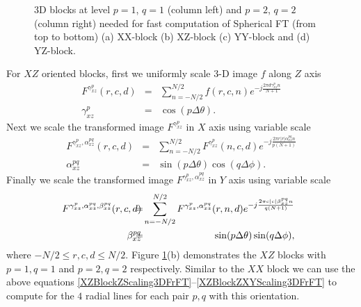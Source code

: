 \documentclass{UCF_ETD}
\begin{document}
\begin{figure}[H]
\begin{center}
 \caption{3D blocks at level $p = 1$, $q = 1$ (column left) and $p = 2$, $q = 2$ (column right) needed for fast computation of Spherical FT (from top to bottom) (a) XX-block (b) XZ-block (c) YY-block and (d) YZ-block.}
 \label{SphericalPolarTransformationAllBlocksLevel1}
 \end{center}
 \end{figure}
 
 
 
 
 For $XZ$ oriented blocks, first we uniformly scale 3-D image $f$ along $Z$ axis
 \begin{eqnarray} \label{XZBlockZScaling3DFrFT}
 F^{\gamma^{p}_{xz}} (r,c,d) & = & \sum\limits_{n=-N/2}^{N/2} f(r,c,n) e^{-j\frac{2\pi d\gamma^{p}_{xz} n}{N+1}} \nonumber \\
 \gamma^{p}_{xz} & = & \cos (p\Delta \theta). %
 \end{eqnarray}
 Next we scale the transformed image $F^{\gamma^{p}_{xz}}$ in $X$ axis using variable scale
 \begin{eqnarray} \label{XZBlockZXScaling3DFrFT}
 F^{\gamma^{p}_{xz}, \alpha^{pq}_{xz} } (r,c,d) & = & \sum\limits_{n=-N/2}^{N/2} F^{\gamma^{p}_{xz}} (n,c,d) e^{-j\frac{2\pi r |r| \alpha^{pq}_{xz} n}{p(N+1)}} \nonumber \\
 \alpha^{pq}_{xz} &=& \sin (p\Delta \theta) \cos (q\Delta \phi). %
 \end{eqnarray}
 Finally we scale the transformed image $F^{\gamma^{p}_{xz}, \alpha^{pq}_{xz} }$ in $Y$ axis using variable scale
 \begin{eqnarray} \label{XZBlockZXYScaling3DFrFT}
 \hskip-0.08in F^{\gamma^{p}_{xz}, \alpha^{pq}_{xz}, \beta^{pq}_{xz} } (r,c,d) & \hskip-0.12in = & \hskip-0.12in  \sum\limits_{n=-N/2}^{N/2}  F^{\gamma^{p}_{xz}, \alpha^{pq}_{xz} } (r,n,d) e^{-j\frac{2\pi c |c| \beta^{pq}_{xz} n}{q(N+1)}} \nonumber \\
 \hskip-0.08in \beta^{pq}_{xz} & \hskip-0.12in =  & \hskip-0.08in \sin (p\Delta \theta) \sin (q\Delta \phi), %
 \end{eqnarray}
 where $-N/2 \leq r,c,d \leq N/2$. Figure \ref{SphericalPolarTransformationAllBlocksLevel1}(b) demonstrates the $XZ$ blocks with $p = 1,q = 1$ and  $p = 2,q = 2$ respectively. Similar to the $XX$ block we can use the above equations \eqref{XZBlockZScaling3DFrFT}--\eqref{XZBlockZXYScaling3DFrFT} to compute for the $4$ radial lines for each pair $p,q$ with this orientation.
 
\end{document}
